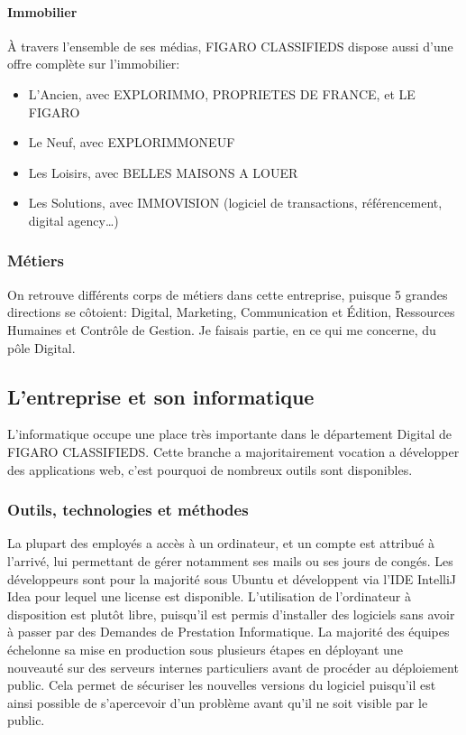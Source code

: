 \paragraph{Immobilier}
À travers l'ensemble de ses médias, FIGARO CLASSIFIEDS dispose aussi d’une offre complète sur l’immobilier:
\begin{itemize}
  \item L’Ancien, avec EXPLORIMMO, PROPRIETES DE FRANCE, et LE FIGARO
  \item Le Neuf, avec EXPLORIMMONEUF
  \item Les Loisirs, avec BELLES MAISONS A LOUER
  \item Les Solutions, avec IMMOVISION (logiciel de transactions, référencement, digital agency…)
\end{itemize}

\subsubsection{Métiers}

On retrouve différents corps de métiers dans cette entreprise, puisque 5 grandes directions se côtoient:  Digital, Marketing, Communication et Édition, Ressources Humaines et Contrôle de Gestion.
Je faisais partie, en ce qui me concerne, du pôle Digital.


\subsection{L'entreprise et son informatique}
L'informatique occupe une place très importante dans le département Digital de FIGARO CLASSIFIEDS.
Cette branche a majoritairement vocation a développer des applications web, c'est pourquoi de nombreux outils sont disponibles.

\subsubsection{Outils, technologies et méthodes}
\label{subs:Outils, technologies et methodes}
La plupart des employés a accès à un ordinateur, et un compte est attribué à l'arrivé, lui permettant de gérer notamment ses mails ou ses jours de congés.
Les développeurs sont pour la majorité sous Ubuntu et développent via l'IDE IntelliJ Idea pour lequel une license est disponible.
L'utilisation de l'ordinateur à disposition est plutôt libre, puisqu'il est permis d'installer des logiciels sans avoir à passer par des Demandes de Prestation Informatique.
La majorité des équipes échelonne sa mise en production sous plusieurs étapes en déployant une nouveauté sur des serveurs internes particuliers avant de procéder au déploiement public.
Cela permet de sécuriser les nouvelles versions du logiciel puisqu'il est ainsi possible de s'apercevoir d'un problème avant qu'il ne soit visible par le public.

